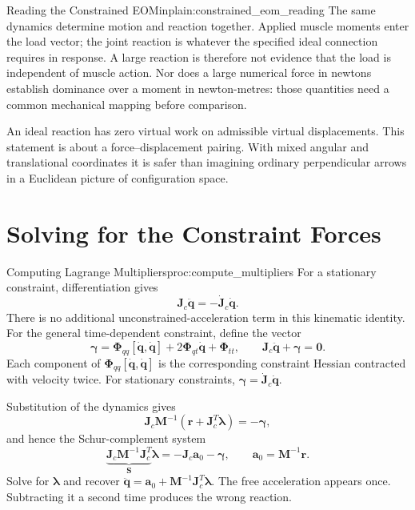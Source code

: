 \begin{laymansbox}{Reading the Constrained EOM}{inplain:constrained_eom_reading}
The same dynamics determine motion and reaction together. Applied muscle moments enter the load vector; the joint reaction is whatever the specified ideal connection requires in response. A large reaction is therefore not evidence that the load is independent of muscle action. Nor does a large numerical force in newtons establish dominance over a moment in newton-metres: those quantities need a common mechanical mapping before comparison.

An ideal reaction has zero virtual work on admissible virtual displacements. This statement is about a force--displacement pairing. With mixed angular and translational coordinates it is safer than imagining ordinary perpendicular arrows in a Euclidean picture of configuration space.
\end{laymansbox}

\section{Solving for the Constraint Forces}
\label{sec:solving_constraint_forces}

\begin{algorithm}{Computing Lagrange Multipliers}{proc:compute_multipliers}
For a stationary constraint, differentiation gives
\begin{equation}
\bm J_c\ddot{\bm q}=-\dot{\bm J}_c\dot{\bm q}.
\label{eq:constraint_acceleration_consistency}
\end{equation}
There is no additional unconstrained-acceleration term in this kinematic identity. For the general time-dependent constraint, define the vector
\[
\bm\gamma=\bm\Phi_{qq}[\dot{\bm q},\dot{\bm q}]
+2\bm\Phi_{qt}\dot{\bm q}+\bm\Phi_{tt},
\qquad \bm J_c\ddot{\bm q}+\bm\gamma=\bm0.
\]
Each component of $\bm\Phi_{qq}[\dot{\bm q},\dot{\bm q}]$ is the corresponding constraint Hessian contracted with velocity twice. For stationary constraints, $\bm\gamma=\dot{\bm J}_c\dot{\bm q}$.

Substitution of the dynamics gives
\begin{equation}
\bm J_c\bm M^{-1}(\bm r+\bm J_c^T\bm\lambda)=-\bm\gamma,
\label{eq:constraint_lambda_equation}
\end{equation}
and hence the Schur-complement system
\begin{equation}
\underbrace{\bm J_c\bm M^{-1}\bm J_c^T}_{\bm S}\bm\lambda
=-\bm J_c\bm a_0-\bm\gamma,
\qquad \bm a_0=\bm M^{-1}\bm r.
\label{eq:lambda_linear_system}
\end{equation}
Solve for $\bm\lambda$ and recover $\ddot{\bm q}=\bm a_0+\bm M^{-1}\bm J_c^T\bm\lambda$. The free acceleration appears once. Subtracting it a second time produces the wrong reaction.
\end{algorithm}

